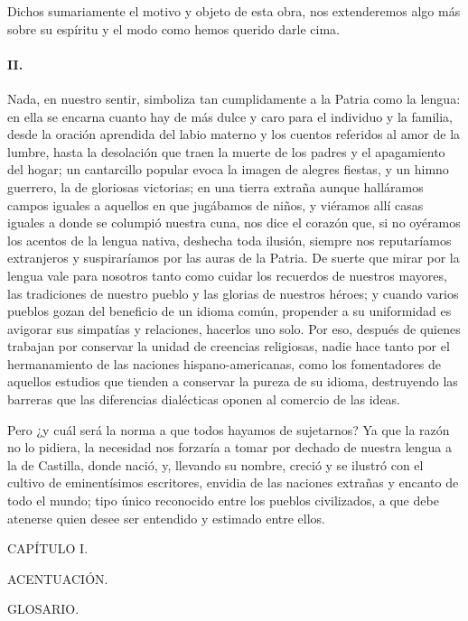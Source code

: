 \documentclass{article}
\begin{document}
Dichos sumariamente el motivo y objeto de esta obra, nos extenderemos algo más sobre su 
espíritu y el modo como hemos querido darle cima.

\paragraph{II.}

Nada, en nuestro sentir, simboliza tan cumplidamente a la Patria como la lengua: en ella se 
encarna cuanto hay de más dulce y caro para el individuo y la familia, desde la oración 
aprendida del labio materno y los cuentos referidos al amor de la lumbre, hasta la desolación 
que traen la muerte de los padres y el apagamiento del hogar; un cantarcillo popular evoca la 
imagen de alegres fiestas, y un himno guerrero, la de gloriosas victorias; en una tierra 
extraña aunque halláramos campos iguales a aquellos en que jugábamos de niños, y viéramos allí 
casas iguales a donde se columpió nuestra cuna, nos dice el corazón que, si no oyéramos los 
acentos de la lengua nativa, deshecha toda ilusión, siempre nos reputaríamos extranjeros y 
suspiraríamos por las auras de la Patria. De suerte que mirar por la lengua vale para nosotros 
tanto como cuidar los recuerdos de nuestros mayores, las tradiciones de nuestro pueblo y las 
glorias de nuestros héroes; y cuando varios pueblos gozan del beneficio de un idioma común, 
propender a su uniformidad es avigorar sus simpatías y relaciones, hacerlos uno solo. Por eso, 
después de quienes trabajan por conservar la unidad de creencias religiosas, nadie hace tanto 
por el hermanamiento de las naciones hispano-americanas, como los fomentadores de aquellos 
estudios que tienden a conservar la pureza de su idioma, destruyendo las barreras que las 
diferencias dialécticas oponen al comercio de las ideas. 

Pero ¿y cuál será la norma a que todos hayamos de sujetarnos? Ya que la razón no lo pidiera, la 
necesidad nos forzaría a tomar por dechado de nuestra lengua a la de Castilla, donde nació, y, 
llevando su nombre, creció y se ilustró con el cultivo de eminentísimos escritores, envidia de 
las naciones extrañas y encanto de todo el mundo; tipo único reconocido entre los pueblos 
civilizados, a que debe atenerse quien desee ser entendido y estimado entre ellos.

CAPÍTULO I.

ACENTUACIÓN.

GLOSARIO.

\small
\end{document}
